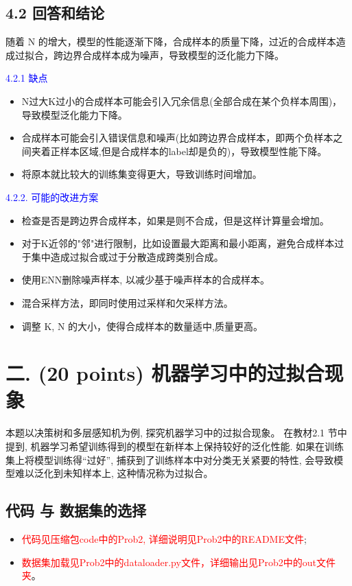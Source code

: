 \documentclass[8pt]{article}
\begin{document}
\subsection*{4.2 回答和结论}
随着 N 的增大，模型的性能逐渐下降，合成样本的质量下降，过近的合成样本造成过拟合，跨边界合成样本成为噪声，导致模型的泛化能力下降。

\textcolor{blue}{4.2.1 缺点}
    \begin{itemize}
        \item N过大K过小的合成样本可能会引入冗余信息(全部合成在某个负样本周围)，导致模型泛化能力下降。
        \item 合成样本可能会引入错误信息和噪声(比如跨边界合成样本，即两个负样本之间夹着正样本区域,但是合成样本的label却是负的)，导致模型性能下降。
        \item 将原本就比较大的训练集变得更大，导致训练时间增加。
    \end{itemize}

\textcolor{blue}{4.2.2. 可能的改进方案}
    \begin{itemize}
        \item 检查是否是跨边界合成样本，如果是则不合成，但是这样计算量会增加。
        \item 对于K近邻的"邻"进行限制，比如设置最大距离和最小距离，避免合成样本过于集中造成过拟合或过于分散造成跨类别合成。
        \item 使用ENN删除噪声样本, 以减少基于噪声样本的合成样本。
        \item 混合采样方法，即同时使用过采样和欠采样方法。
        \item 调整 K, N 的大小，使得合成样本的数量适中,质量更高。
    \end{itemize}

\vspace{3em}

\section*{二. (20 points) 机器学习中的过拟合现象}

本题以决策树和多层感知机为例, 探究机器学习中的过拟合现象。 在教材2.1 节中提到, 机器学习希望训练得到的模型在新样本上保持较好的泛化性能. 如果在训练集上将模型训练得“过好”, 捕获到了训练样本中对分类无关紧要的特性, 会导致模型难以泛化到未知样本上, 这种情况称为过拟合。

\subsection*{代码 与 数据集的选择}
\begin{itemize}
    \item \textcolor{red}{代码见压缩包code中的Prob2, 详细说明见Prob2中的README文件}; 
    \item \textcolor{red}{数据集加载见Prob2中的dataloader.py文件，详细输出见Prob2中的out文件夹}。
\end{itemize}
\end{document}
